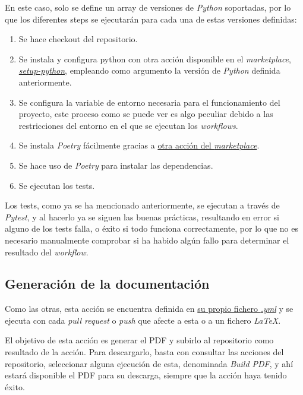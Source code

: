 En este caso, solo se define un array de versiones de \textit{Python} soportadas, por lo que los diferentes steps se ejecutarán para cada una de estas versiones definidas:

\begin{enumerate}
    \item Se hace checkout del repositorio.
    \item Se instala y configura python con otra acción disponible en el \textit{marketplace}, \href{https://github.com/marketplace/actions/setup-python}{\textit{setup-python}}, empleando como argumento la versión de \textit{Python} definida anteriormente.
    \item Se configura la variable de entorno necesaria para el funcionamiento del proyecto, este proceso como se puede ver es algo peculiar debido a las restricciones del entorno en el que se ejecutan los \textit{workflows}.
    \item Se instala \textit{Poetry} fácilmente gracias a \href{https://github.com/marketplace/actions/install-poetry-action}{otra acción del \textit{marketplace}}.
    \item Se hace uso de \textit{Poetry} para instalar las dependencias.
    \item Se ejecutan los tests.
\end{enumerate}

Los tests, como ya se ha mencionado anteriormente, se ejecutan a través de \textit{Pytest}, y al hacerlo ya se siguen las buenas prácticas, resultando en error si alguno de los tests falla, o éxito si todo funciona correctamente, por lo que no es necesario manualmente comprobar si ha habido algún fallo para determinar el resultado del \textit{workflow}.

\subsection{Generación de la documentación}

Como las otras, esta acción se encuentra definida en \href{https://github.com/Anglepi/My-Many-Reads/blob/main/.github/workflows/latex-build.yml}{su propio fichero \textit{.yml}} y se  ejecuta con cada \textit{pull request} o \textit{push} que afecte a esta o a un fichero \textit{LaTeX}.

El objetivo de esta acción es generar el PDF y subirlo al repositorio como resultado de la acción. Para descargarlo, basta con consultar las acciones del repositorio, seleccionar alguna ejecución de esta, denominada \textit{Build PDF}, y ahí estará disponible el PDF para su descarga, siempre que la acción haya tenido éxito.

